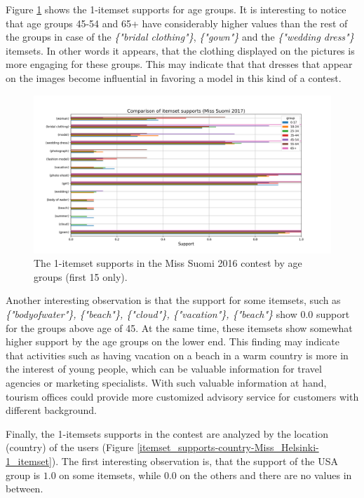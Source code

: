 Figure \ref{itemset_supports-age_group-Miss_Helsinki-1_itemset} shows the 1-itemset supports for age groups. It is interesting to notice that age groups 45-54 and 65+ have considerably higher values than the rest of the groups in case of the \emph{\{"bridal clothing"\}}, \emph{\{"gown"\}} and the \emph{\{"wedding dress"\}} itemsets. In other words it appears, that the clothing displayed on the pictures is more engaging for these groups. This may indicate that that dresses that appear on the images become influential in favoring a model in this kind of a contest. 

\begin{figure}[h] 
    \begin{center}
        \includegraphics[width=1.0\textwidth]{Images/itemset_supports-age_group-Miss_Helsinki-1_itemset.png}
        \caption{The 1-itemset supports in the Miss Suomi 2016 contest by age groups (first 15 only).}
        \label{itemset_supports-age_group-Miss_Helsinki-1_itemset}
    \end{center}
\end{figure}

Another interesting observation is that the support for some itemsets, such as \emph{\{"body\:of\:water"\}, \{"beach"\}, \{"cloud"\}, \{"vacation"\}, \{"beach"\}} show 0.0 support for the groups above age of 45. At the same time, these itemsets show somewhat higher support by the age groups on the lower end. This finding may indicate that activities such as having vacation on a beach in a warm country is more in the interest of young people, which can be valuable information for travel agencies or marketing specialists. With such valuable information at hand, tourism offices could provide more customized advisory service for customers with different background. 

Finally, the 1-itemsets supports in the contest are analyzed by the location (country) of the users (Figure \ref{itemset_supports-country-Miss_Helsinki-1_itemset}). The first interesting observation is, that the support of the USA group is $1.0$ on some itemsets, while 0.0 on the others and there are no values in between.

